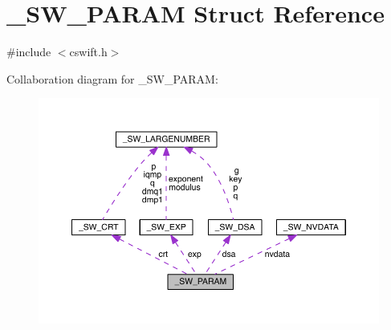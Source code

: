 \hypertarget{struct___s_w___p_a_r_a_m}{}\section{\+\_\+\+S\+W\+\_\+\+P\+A\+R\+AM Struct Reference}
\label{struct___s_w___p_a_r_a_m}


{\ttfamily \#include $<$cswift.\+h$>$}



Collaboration diagram for \+\_\+\+S\+W\+\_\+\+P\+A\+R\+AM\+:\nopagebreak
\begin{figure}[H]
\begin{center}
\leavevmode
\includegraphics[width=350pt]{struct___s_w___p_a_r_a_m__coll__graph}
\end{center}
\end{figure}

